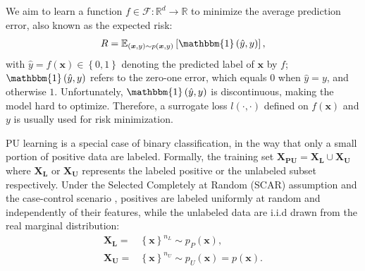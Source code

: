 \documentclass[final]{cvpr}
\newcommand{\examplex}{\bm{x}}
\newcommand{\puset}{\bm{X_{PU}}}
\newcommand{\lsubset}{\bm{X_{L}}}
\newcommand{\usubset}{\bm{X_{U}}}
\newcommand{\xdist}{\mathcal{X}}
\newcommand{\xdistp}{\mathcal{X_{P}}}
\newcommand{\xdistn}{\mathcal{X_{N}}}
\newcommand{\ydist}{\mathcal{Y}}
\newcommand{\expectation}[1]{\mathbb{E}_{#1}}
\newcommand{\zeronerror}{\mathbbm{1}\left(\hat{y}, y\right)}
\newcommand{\bangyan}[1]{#1}
\begin{document}
We aim to learn a function $f \in \mathcal{F}: \mathbb{R}^{d} \rightarrow \mathbb{R}$ to minimize the average prediction error, also known as the expected risk:
\begin{align}
    R = \expectation{(\examplex,y) \sim p(\examplex,y)} \left[ \zeronerror \right], \label{eq:exp_risk}
\end{align}
with $\hat{y}=f(\examplex) \in \left\{ 0,1 \right\}$ denoting the predicted label of $\examplex$ by $f$; $\zeronerror$ refers to the zero-one error, which equals $0$ when $\hat{y}=y$, and otherwise $1$. Unfortunately,  $\zeronerror$ is discontinuous, making the model hard to optimize. Therefore, a surrogate loss $l(\cdot,\cdot)$ defined on $f(\examplex)$ and $y$ is usually used for risk minimization.

PU learning is a special case of binary classification, in the way that only a small portion of positive data are labeled. Formally, the training set $\puset = \lsubset \cup \usubset$ where $\lsubset$ or $\usubset$ represents the labeled positive or the unlabeled subset respectively. Under the Selected Completely at Random (SCAR) assumption and the case-control scenario \bangyan{\cite{DBLP:journals/ml/BekkerD20}}, positives are labeled uniformly at random and independently of their features, while the unlabeled data are i.i.d drawn from the real marginal distribution:
\begin{align}
    \lsubset = & \left\{ \examplex \right\}^{n_{L}} \sim  p_{P}\left(\examplex\right), 
    \label{eq:dist_lp} \\
    \usubset = & \left\{ \examplex \right\}^{n_{U}} \sim  p_{U}\left(\examplex\right)=p\left(\examplex\right). \label{eq:dist_u}
\end{align}
\end{document}
